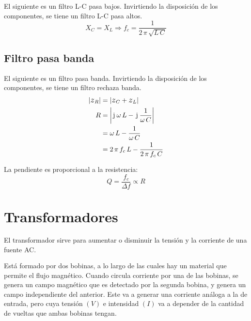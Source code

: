 \documentclass[a5paper,12pt,twoside]{book}
\begin{document}
El siguiente es un filtro L-C pasa bajos.
Invirtiendo la disposición de los componentes, se tiene un filtro L-C pasa altos.
\begin{equation*}
    X_C = X_L \Rightarrow f_c = \dfrac{1}{2 \, \pi \, \sqrt{L \, C}}
\end{equation*}

\begin{center}
    \def\svgwidth{0.6\linewidth}
    
\end{center}


\subsection{Filtro pasa banda}

El siguiente es un filtro pasa banda.
Invirtiendo la disposición de los componentes, se tiene un filtro rechaza banda.
\begin{align*}
    \norm{\impedance_R} &= \norm{\impedance_C + \impedance_L}
    \\
    R &= \norm{\iu \, \omega \, L - \iu \, \frac{1}{\omega \, C}}
    \\
    &= \omega \, L - \frac{1}{\omega \, C}
    \\
    &= 2 \, \pi \, f_c \, L - \frac{1}{2 \, \pi \, f_c \, C}
\end{align*}

\begin{center}
    \def\svgwidth{0.6\linewidth}
    
\end{center}

La pendiente es proporcional a la resistencia:
\begin{equation*}
    Q = \frac{f_c}{\Delta f} \propto R
\end{equation*}


\section{Transformadores}

El transformador sirve para aumentar o disminuir la tensión y la corriente de una fuente AC.

Está formado por dos bobinas, a lo largo de las cuales hay un material que permite el flujo magnético.
Cuando circula corriente por una de las bobinas, se genera un campo magnético que es detectado por la segunda bobina, y genera un campo independiente del anterior.
Este va a generar una corriente análoga a la de entrada, pero cuya tensión $(V)$ e intensidad $(I)$ va a depender de la cantidad de vueltas que ambas bobinas tengan.
\end{document}
